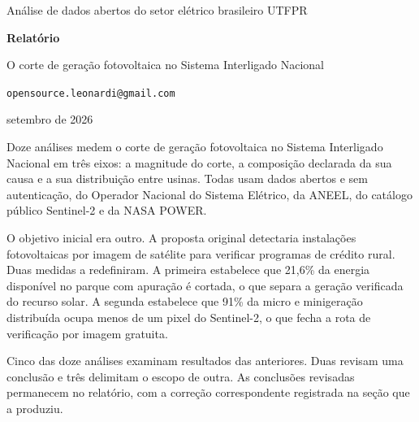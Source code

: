 
\thispagestyle{empty}

\vspace*{2.2cm}

\begingroup
\sffamily\raggedright
{\fontsize{9}{11}\selectfont\color{tinta2}
Análise de dados abertos do setor elétrico brasileiro \textbullet{} UTFPR\par}
\vspace{1.4em}
{\fontsize{28}{32}\selectfont\bfseries
Relatório\par}
\vspace{0.6em}
{\fontsize{14}{18}\selectfont\color{tinta2}
O corte de geração fotovoltaica no Sistema Interligado Nacional\par}
\vspace{2.2em}
{\fontsize{10}{13}\selectfont
{}\par
\vspace{0.3em}
{\color{tinta2}\texttt{opensource.leonardi@gmail.com}}\par
\vspace{0.3em}
{\color{tinta2}setembro de 2026}\par}
\endgroup

\vspace{2.4cm}

\begin{minipage}{15cm}
\setlength{\parskip}{0.6em}
\noindent
Doze análises medem o corte de geração fotovoltaica no Sistema Interligado
Nacional em três eixos: a magnitude do corte, a composição declarada da sua
causa e a sua distribuição entre usinas. Todas usam dados abertos e sem
autenticação, do Operador Nacional do Sistema Elétrico, da ANEEL, do catálogo
público Sentinel-2 e da NASA POWER.

O objetivo inicial era outro. A proposta original detectaria instalações
fotovoltaicas por imagem de satélite para verificar programas de crédito rural.
Duas medidas a redefiniram. A primeira estabelece que 21,6\% da energia
disponível no parque com apuração é cortada, o que separa a geração verificada
do recurso solar. A segunda estabelece que 91\% da micro e minigeração
distribuída ocupa menos de um pixel do Sentinel-2, o que fecha a rota de
verificação por imagem gratuita.

Cinco das doze análises examinam resultados das anteriores. Duas revisam uma
conclusão e três delimitam o escopo de outra. As conclusões revisadas
permanecem no relatório, com a correção correspondente registrada na seção que
a produziu.
\end{minipage}


